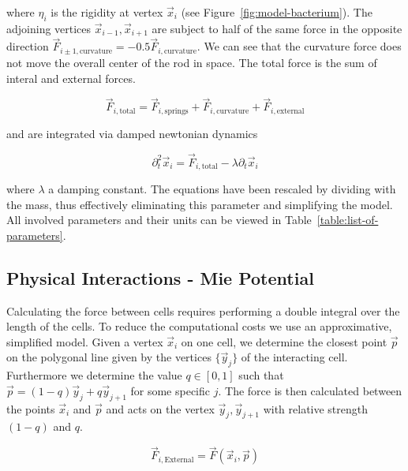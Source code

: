 \documentclass{article}
\begin{document}
where $\eta_i$ is the rigidity at vertex $\vec{x}_i$ (see Figure~\ref{fig:model-bacterium}).
The adjoining vertices $\vec{x}_{i-1},\vec{x}_{i+1}$ are subject to half of the same force in the
opposite direction $\vec{F}_{i\pm 1,\text{curvature}} = -0.5\vec{F}_{i,\text{curvature}}$.
We can see that the curvature force does not move the overall center of the rod in space.
The total force is the sum of interal and external forces.

\begin{equation}
    \vec{F}_{i,\text{total}} = \vec{F}_{i,\text{springs}}+ \vec{F}_{i,\text{curvature}}
        + \vec{F}_{i,\text{external}}
\end{equation}

and are integrated via damped newtonian dynamics

\begin{equation}
    \partial_t^2 \vec{x}_i = \vec{F}_{i,\text{total}} - \lambda \partial_t\vec{x}_i
\end{equation}

where $\lambda$ a damping constant.
The equations have been rescaled by dividing with the mass, thus effectively eliminating this
parameter and simplifying the model.
All involved parameters and their units can be viewed in Table~\ref{table:list-of-parameters}.

\subsection{Physical Interactions - Mie Potential}

Calculating the force between cells requires performing a double integral over the length of the
cells.
To reduce the computational costs we use an approximative, simplified model.
Given a vertex $\vec{x}_i$ on one cell, we determine the closest point $\vec{p}$ on the polygonal
line given by the vertices $\{\vec{y}_j\}$ of the interacting cell.
Furthermore we determine the value $q\in[0,1]$ such that $\vec{p} = (1-q)\vec{y}_j + q\vec{y}_{j+1}$
for some specific $j$.
The force is then calculated between the points $\vec{x}_i$ and $\vec{p}$ and acts on
the vertex $\vec{y}_j,\vec{y}_{j+1}$ with relative strength $(1-q)$ and $q$.

\begin{equation}
    \vec{F}_{i,\text{External}} = \vec{F}(\vec{x}_i,\vec{p})
\end{equation}
\end{document}
